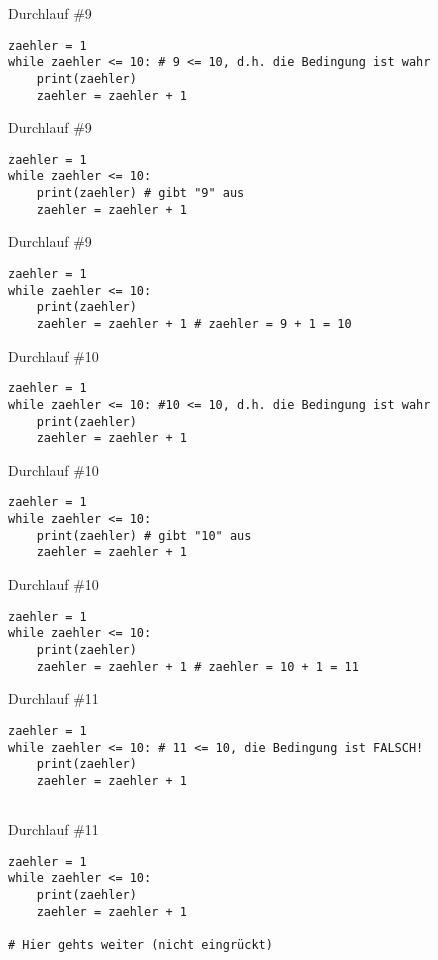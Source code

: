 \documentclass{\VorlagenPfad/coderdojokabeamer}
\begin{document}
\begin{frame}[fragile]{Durchlauf \#9}
	\begin{verbatim}
zaehler = 1
while zaehler <= 10: # 9 <= 10, d.h. die Bedingung ist wahr
	print(zaehler)
	zaehler = zaehler + 1
	\end{verbatim}
\end{frame}

\begin{frame}[fragile]{Durchlauf \#9}
	\begin{verbatim}
zaehler = 1
while zaehler <= 10:
	print(zaehler) # gibt "9" aus
	zaehler = zaehler + 1
	\end{verbatim}
\end{frame}

\begin{frame}[fragile]{Durchlauf \#9}
	\begin{verbatim}
zaehler = 1
while zaehler <= 10:
	print(zaehler)
	zaehler = zaehler + 1 # zaehler = 9 + 1 = 10
	\end{verbatim}
\end{frame}



\begin{frame}[fragile]{Durchlauf \#10}
	\begin{verbatim}
zaehler = 1
while zaehler <= 10: #10 <= 10, d.h. die Bedingung ist wahr
	print(zaehler)
	zaehler = zaehler + 1
	\end{verbatim}
\end{frame}

\begin{frame}[fragile]{Durchlauf \#10}
	\begin{verbatim}
zaehler = 1
while zaehler <= 10:
	print(zaehler) # gibt "10" aus
	zaehler = zaehler + 1
	\end{verbatim}
\end{frame}

\begin{frame}[fragile]{Durchlauf \#10}
	\begin{verbatim}
zaehler = 1
while zaehler <= 10:
	print(zaehler)
	zaehler = zaehler + 1 # zaehler = 10 + 1 = 11
	\end{verbatim}
\end{frame}



\begin{frame}[fragile]{Durchlauf \#11}
	\begin{verbatim}
zaehler = 1
while zaehler <= 10: # 11 <= 10, die Bedingung ist FALSCH!
	print(zaehler) 
	zaehler = zaehler + 1 
	
	\end{verbatim}
\end{frame}

\begin{frame}[fragile]{Durchlauf \#11}
	\begin{verbatim}
zaehler = 1
while zaehler <= 10:
	print(zaehler) 
	zaehler = zaehler + 1 
		
# Hier gehts weiter (nicht eingrückt)
	\end{verbatim}
\end{frame}
\end{document}
